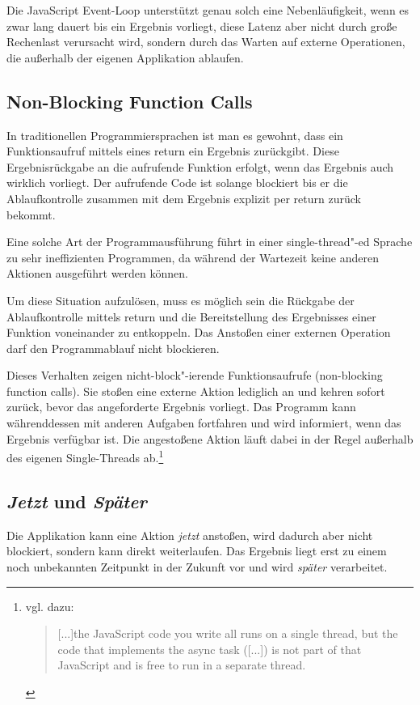 \documentclass[
11pt, %
a4paper, %
oneside, %
pdfspacing, %
headinclude,
BCOR5mm, %
ngerman, %
bibtotocnumbered,
]{scrartcl}
\begin{document}
		Die JavaScript Event-Loop unterstützt genau solch eine Nebenläufigkeit, wenn es zwar lang dauert bis ein Ergebnis vorliegt, diese Latenz aber nicht durch große Rechenlast verursacht wird, sondern durch das Warten auf externe Operationen, die außerhalb der eigenen Applikation ablaufen. 
	

	\subsection{Non-Blocking Function Calls}
	In traditionellen Programmiersprachen ist man es gewohnt, dass ein Funktionsaufruf mittels eines \textsf{return} ein Ergebnis zurückgibt. Diese Ergebnisrückgabe an die aufrufende Funktion erfolgt, wenn das Ergebnis auch wirklich vorliegt. Der aufrufende Code ist solange blockiert bis er die Ablaufkontrolle zusammen mit dem Ergebnis explizit per \textsf{return} zurück bekommt.
	
	Eine solche Art der Programmausführung führt in einer single-thread"-ed Sprache zu sehr ineffizienten Programmen, da während der Wartezeit keine anderen Aktionen ausgeführt werden können. 
	
	Um diese Situation aufzulösen, muss es möglich sein die Rückgabe der Ablaufkontrolle mittels \textsf{return} und die Bereitstellung des Ergebnisses einer Funktion voneinander zu entkoppeln. Das Anstoßen einer externen Operation darf den Programmablauf nicht blockieren.
	
	Dieses Verhalten zeigen nicht-block"-ierende Funktionsaufrufe (non-blocking function calls). Sie stoßen eine externe Aktion lediglich an und kehren sofort zurück, bevor das angeforderte Ergebnis vorliegt. Das Programm kann währenddessen mit anderen Aufgaben fortfahren und wird informiert, wenn das Ergebnis verfügbar ist. Die angestoßene Aktion läuft dabei in der Regel außerhalb des eigenen Single-Threads ab.\footnote{vgl. dazu:
		\begin{quote}[...]the JavaScript code you write all runs on a single thread, but the code that implements the async task ([...]) is not part of that JavaScript and is free to run in a separate thread.~\citep[S.~7]{Parker.2015}\end{quote}}
	
	\subsection{\emph{Jetzt} und \emph{Später}}
	
	Die Applikation kann eine Aktion \emph{jetzt} anstoßen, wird dadurch aber nicht blockiert, sondern kann direkt weiterlaufen. Das Ergebnis liegt erst zu einem noch unbekannten Zeitpunkt in der Zukunft vor und wird \textit{später} verarbeitet. 
		
\end{document}
